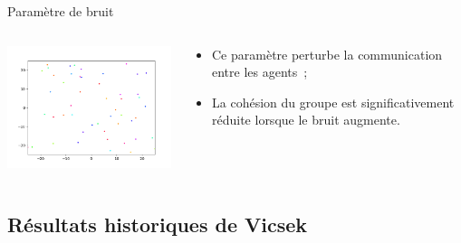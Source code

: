 \documentclass[aspectratio=43, a4paper, 12pt]{beamer}
\begin{document}
\begin{frame}{Paramètre de bruit}
\begin{columns}
			\begin{column}{0.6\paperwidth}
		       \begin{center}\includegraphics[width=8cm]{images/image_10.png}\end{center}
			\end{column}
			
			\begin{column}{0.4\paperwidth}
				\begin{itemize}
					\item<1-> Ce paramètre perturbe la communication entre les agents~;
					\item<2-> La cohésion du groupe est significativement réduite lorsque le bruit augmente.
          \end{itemize}			
			\end{column}
		\end{columns}		
	\end{frame}

\subsection{Résultats historiques de Vicsek}
\end{document}
